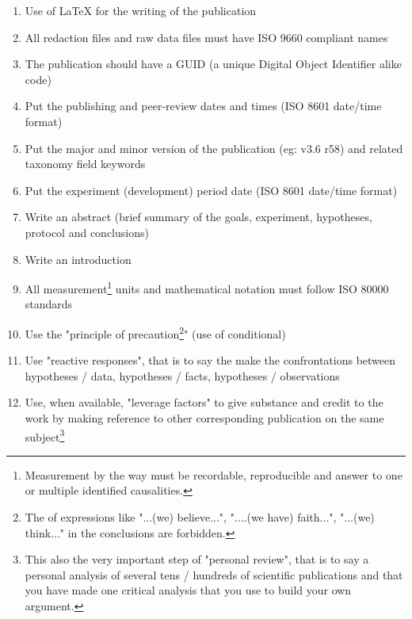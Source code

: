 	\begin{enumerate}[label=\protect\circledbullet{\arabic*},leftmargin=15mm]
		\item Use of \LaTeX{} for the writing of the publication
		
		\item All redaction files and raw data files must have ISO 9660 compliant names
		
		\item The publication should have a GUID (a unique Digital Object Identifier alike code)
		
		\item Put the publishing and peer-review dates  and times (ISO 8601 date/time format)
		
		\item Put the major and minor version of the publication (eg: v3.6 r58) and related taxonomy field keywords
		
		\item Put the experiment (development) period date (ISO 8601 date/time format)
		
		\item Write an abstract (brief summary of the goals, experiment, hypotheses, protocol and conclusions)
		
		\item Write an introduction

		\item All measurement\footnote{Measurement by the way must be recordable, reproducible and answer to one or multiple identified causalities.} units and mathematical notation must follow ISO 80000 standards 
		
		\item Use the "principle of precaution\footnote{The of expressions like "...(we) believe...", "....(we have) faith...", "...(we) think..." in the conclusions are forbidden.}" (use of conditional)
		
		\item Use "reactive responses", that is to say the make the confrontations between hypotheses / data, hypotheses / facts, hypotheses / observations 
		
		\item Use, when available, "leverage factors" to give substance and credit to the work by making reference to other corresponding publication on the same subject\footnote{This also the very important step of "personal review", that is to say a personal analysis of several tens / hundreds of scientific publications and that you have made one critical analysis that you use to build your own argument.}
		

\end{enumerate}
